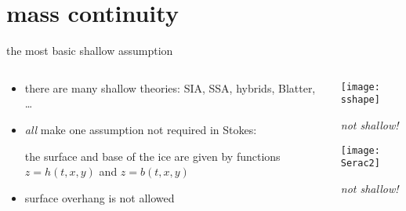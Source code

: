 
\section{mass continuity}

\begin{frame}{the most basic shallow assumption}

\begin{columns}

\begin{column}{0.6\textwidth}
\begin{itemize}
\item there are many shallow theories: SIA, SSA, hybrids, Blatter, \dots \nocite{Blatter}
\item \emph{all} make one assumption not required in Stokes:

\begin{center}
\alert{the surface and base of the ice are given by functions $z=h(t,x,y)$ and $z=b(t,x,y)$}
\end{center}
\item surface overhang is not allowed
\end{itemize}
\end{column}

\begin{column}{0.4\textwidth}
\texttt{[image: sshape]}

\scriptsize
\begin{center}
\emph{not shallow!}
\end{center}
\vspace{6mm}

\texttt{[image: Serac2]}

\begin{center}
\emph{not shallow!}
\end{center}
\end{column}
\end{columns}
\end{frame}


